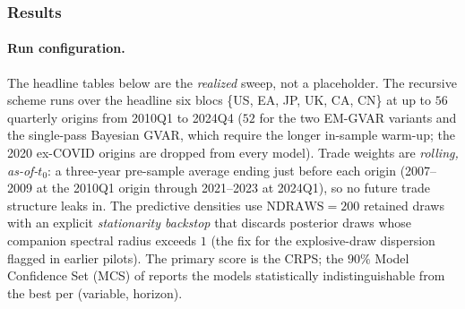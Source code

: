 \documentclass[11pt]{article}
\theoremstyle{definition}
\theoremstyle{remark}
\begin{document}
\subsubsection{Results}\label{sec:empirical:results}

\paragraph{Run configuration.} The headline tables below are the
\emph{realized} sweep, not a placeholder. The recursive scheme runs over
the headline six blocs \{US, EA, JP, UK, CA, CN\} at up to $56$ quarterly
origins from 2010Q1 to 2024Q4 ($52$ for the two EM-GVAR variants and the
single-pass Bayesian GVAR, which require the longer in-sample warm-up; the
2020 ex-COVID origins are dropped from every model). Trade weights are
\emph{rolling, as-of-$t_0$}: a three-year pre-sample average ending just
before each origin (2007--2009 at the 2010Q1 origin through 2021--2023 at
2024Q1), so no future trade structure leaks in. The predictive densities
use $\mathrm{NDRAWS}=200$ retained draws with an explicit
\emph{stationarity backstop} that discards posterior draws whose companion
spectral radius exceeds $1$ (the fix for the explosive-draw dispersion
flagged in earlier pilots). The primary score is the CRPS; the $90\%$
Model Confidence Set (MCS) of \citet{HansenLundeNason2011} reports the
models statistically indistinguishable from the best per
(variable, horizon).
\end{document}

